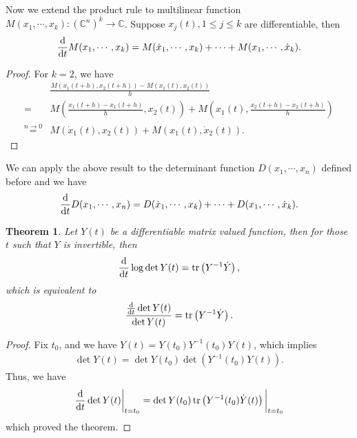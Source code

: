 \documentclass[11pt]{book}
\newtheorem{theorem}{Theorem}[section]
\theoremstyle{definition}
\numberwithin{equation}{chapter}
\begin{document}
Now we extend the product rule to multilinear function $M(x_1,\cdots, x_k): \left(\mathbb{C}^n\right)^k \to \mathbb{C}$. Suppose $x_j(t), 1\leq j \leq k$ are differentiable, then 
\begin{align*}
    \dv{}{t}M(x_1,\cdots, x_k) = M(\dot{x}_1,\cdots, x_k) + \cdots + M(x_1,\cdots, \dot{x}_k).
\end{align*}
\begin{proof}
For $k=2$, we have
\begin{align*}
    & \frac{M(x_1(t+h), x_2(t+h)) - M(x_1(t), x_2(t))}{h} \\
    = & M\left(\frac{x_1(t+h)-x_1(t+h)}{h}, x_2(t)\right) + M\left(x_1(t),\frac{x_2(t+h)-x_2(t+h)}{h} \right) \\
    \overset{n\to 0}{=} & M(\dot{x}_1(t), x_2(t)) + M(x_1(t), \dot{x}_2(t)).
\end{align*}
\end{proof}

We can apply the above result to the determinant function $D(x_1,\cdots,x_n)$ defined before and we have
\begin{align*}
    \dv{}{t}D(x_1,\cdots,x_n) = D(\dot{x}_1,\cdots, x_k) + \cdots + D(x_1,\cdots, \dot{x}_k).
\end{align*}

\medskip

\begin{theorem}\label{trace_determinant}
Let $Y(t)$ be a differentiable matrix valued function, then for those $t$ such that $Y$ is invertible, then
\begin{align*}
    \dv{}{t} \log \det Y(t) = \tr \left(Y^{-1} \dot{Y}\right),
\end{align*}
which is equivalent to 
\begin{align*}
    \frac{\dv{}{t}\det Y(t)}{\det Y(t)} = \tr \left(Y^{-1} \dot{Y}\right).
\end{align*}
\end{theorem}
\begin{proof}
Fix $t_0$, and we have $Y(t) = Y(t_0) Y^{-1}(t_0) Y(t)$, which implies
\begin{align*}
    \det Y(t) = \det Y(t_0) \det (Y^{-1}(t_0) Y(t)).
\end{align*}
Thus, we have
\begin{align*}
    \dv{}{t}\det Y(t)\bigg|_{t=t_0} = \det Y(t_0) \tr \left(Y^{-1}(t_0) \dot{Y}(t) \right)\bigg|_{t=t_0}
\end{align*}
which proved the theorem.
\end{proof}
\end{document}
